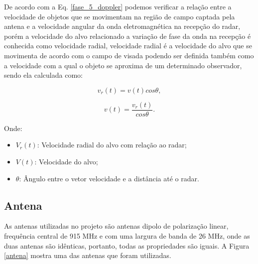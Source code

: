 De acordo com a Eq. \ref{fase_5_doppler} podemos verificar a relação entre a velocidade de objetos que se movimentam na região de campo captada pela antena e a velocidade angular da onda eletromagnética na recepção do radar, porém a velocidade do alvo relacionado a variação de fase da onda na recepção é conhecida como velocidade radial, velocidade radial é a velocidade do alvo que se movimenta de acordo com o campo de visada podendo ser definida também como a velocidade com a qual o objeto se aproxima de um determinado observador, sendo ela calculada como:

\begin{equation}
    \label{V_r}
    v_r(t) = v(t)cos\theta,
\end{equation}

\begin{equation}
    \label{V_r}
    v(t) = \frac{v_r(t)}{cos\theta}.
\end{equation}

Onde:
\begin{itemize}
    \item $V_r(t)$: Velocidade radial do alvo com relação ao radar;
    \item $V(t)$: Velocidade do alvo;
    \item $\theta$: Ângulo entre o vetor velocidade e a distância até o radar.
\end{itemize}


\subsection{Antena}

As antenas utilizadas no projeto são antenas dipolo de polarização linear, frequência central de 915 MHz e com uma largura de banda de 26 MHz, onde as duas antenas são idênticas, portanto, todas as propriedades são iguais. A Figura \ref{antena} mostra uma das antenas que foram utilizadas. 

